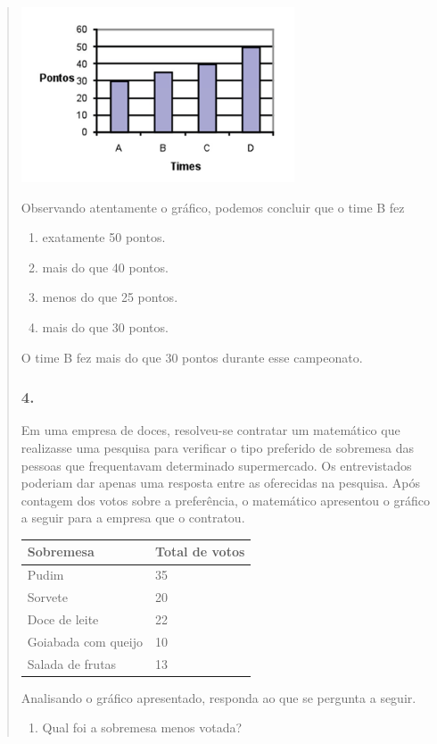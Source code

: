 \begin{enumerate}
\begin{escolha}
\begin{enumerate}
\begin{itemize}
\begin{itemize}
\begin{escolha}
\begin{quote}
\begin{escolha}
{\includegraphics[width=3.19194in,height=2.04184in]{media/image96.png}

Observando atentamente o gráfico, podemos concluir que o time B fez

\begin{enumerate}
\def\labelenumi{\alph{enumi})}
\item
  exatamente 50 pontos.
\item
  mais do que 40 pontos.
\item
  menos do que 25 pontos.
\item
  mais do que 30 pontos.
\end{enumerate}

O time B fez mais do que 30 pontos durante esse campeonato.

\subsubsection{4.}\label{section-94}

Em uma empresa de doces, resolveu-se contratar um matemático que realizasse uma
pesquisa para verificar o tipo preferido de sobremesa das pessoas que
frequentavam determinado supermercado. Os entrevistados poderiam dar
apenas uma resposta entre as oferecidas na pesquisa. Após contagem dos
votos sobre a preferência, o matemático apresentou o gráfico a seguir
para a empresa que o contratou.

\begin{longtable}[]{@{}ll@{}}
\toprule
Sobremesa & Total de votos\tabularnewline
\midrule
\endhead
Pudim & 35\tabularnewline
Sorvete & 20\tabularnewline
Doce de leite & 22\tabularnewline
Goiabada com queijo & 10\tabularnewline
Salada de frutas & 13\tabularnewline
\bottomrule
\end{longtable}

Analisando o gráfico apresentado, responda ao que se pergunta a seguir.

\begin{enumerate}
\def\labelenumi{\alph{enumi})}
\item
  Qual foi a sobremesa menos votada?
\end{enumerate}

}
\end{escolha}
\end{quote}
\end{escolha}
\end{itemize}
\end{itemize}
\end{enumerate}
\end{escolha}
\end{enumerate}
